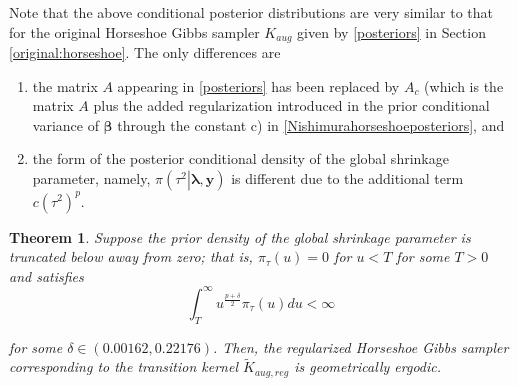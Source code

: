 \documentclass[noinfoline,11pt]{imsart}
\numberwithin{equation}{section}
\theoremstyle{plain}
\newtheorem{thm}{Theorem}[section]
\newcommand{\y}{\mathbf{y}}
\newcommand{\X}{\mathbf{X}}
\newcommand{\bb}{\boldsymbol{\beta}}
\newcommand{\bl}{\boldsymbol{\lambda}}
\begin{document}
Note that the above conditional posterior distributions are very similar to that for the original Horseshoe Gibbs sampler $K_{aug}$ given by \eqref{posteriors} in Section \ref{original:horseshoe}. The only differences are 
\begin{enumerate}
    \item the matrix $A$ appearing in \eqref{posteriors} has been replaced by $A_c$ (which is the matrix $A$ plus the added regularization introduced in the prior conditional variance of $\bb$ through the constant c) in \eqref{Nishimurahorseshoeposteriors}, and
    \item the form of the posterior conditional density of the global shrinkage parameter, namely, $\pi\left(\left.\tau^2\right|\bl,\y\right)$ is different due to the additional term $c(\tau^2)^p$. 
\end{enumerate}

\begin{thm}\label{TheoremNishimurahorseshoe}
Suppose the prior density of the global shrinkage parameter is truncated below away 
from zero; that is, $\pi_\tau(u)=0$ for $u<T$ for some $T>0$ and satisfies 
$$
\int_T^{\infty}u^{\frac{p+\delta}{2}}\pi_\tau(u) du<\infty
$$

\noindent
for some $\delta\in (0.00162,0.22176)$. Then, the regularized Horseshoe Gibbs sampler corresponding to the transition kernel $\tilde K_{aug,reg}$ is geometrically ergodic. \end{thm}
\end{document}
